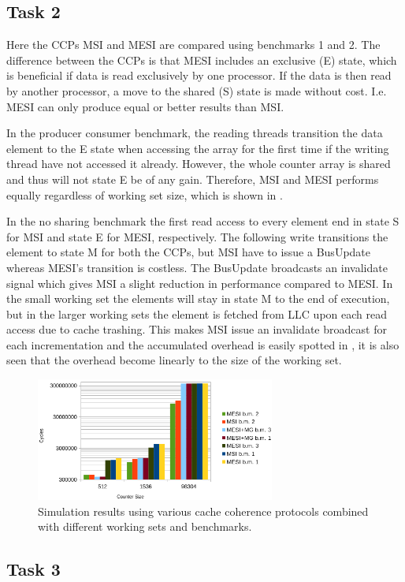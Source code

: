 \subsection{Task 2}
\label{sec:lab12}
Here the CCPs MSI and MESI are compared using benchmarks 1 and 2. The difference between the CCPs is that MESI includes an exclusive (E) state, which is beneficial if data is read exclusively by one processor. If the data is then read by another processor, a move to the shared (S) state is made without cost. I.e. MESI can only produce equal or better results than MSI.

In the producer consumer benchmark, the reading threads transition the data element to the E state when accessing the array for the first time if the writing thread have not accessed it already. However, the whole counter array is shared and thus will not state E be of any gain. Therefore, MSI and MESI performs equally regardless of working set size, which is shown in .

In the no sharing benchmark the first read access to every element end in state S for MSI and state E for MESI, respectively. The following write transitions the element to state M for both the CCPs, but MSI have to issue a BusUpdate whereas MESI's transition is costless. The BusUpdate broadcasts an invalidate signal which gives MSI a slight reduction in performance compared to MESI. In the small working set the elements will stay in state M to the end of execution, but in the larger working sets the element is fetched from LLC upon each read access due to cache trashing. This makes MSI issue an invalidate broadcast for each incrementation and the accumulated overhead is easily spotted in , it is also seen that the overhead become linearly to the size of the working set.

\begin{figure}[t]
	\center
	\includegraphics[width=0.7\textwidth]{bars}
	\caption{Simulation results using various cache coherence protocols combined with different working sets and benchmarks.}
	\label{fig:resultslab1}
\end{figure}

\subsection{Task 3}
\label{sec:lab13}
